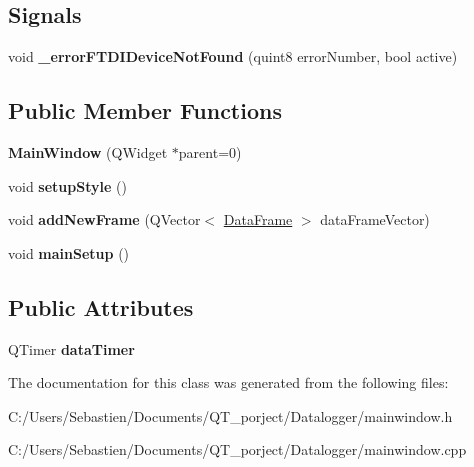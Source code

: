 \subsection*{Signals}
\begin{DoxyCompactItemize}
\item 
\mbox{\label{class_main_window_a7fb16a56a5bdc289ebee60e0d3958a9d}} 
void {\bfseries \+\_\+error\+F\+T\+D\+I\+Device\+Not\+Found} (quint8 error\+Number, bool active)
\end{DoxyCompactItemize}
\subsection*{Public Member Functions}
\begin{DoxyCompactItemize}
\item 
\mbox{\label{class_main_window_a8b244be8b7b7db1b08de2a2acb9409db}} 
{\bfseries Main\+Window} (Q\+Widget $\ast$parent=0)
\item 
\mbox{\label{class_main_window_a143e270946cc75c8b6ab9f44e260b515}} 
void {\bfseries setup\+Style} ()
\item 
\mbox{\label{class_main_window_aadbb2583bcb8abf2053763b137950c21}} 
void {\bfseries add\+New\+Frame} (Q\+Vector$<$ \hyperlink{class_data_frame}{Data\+Frame} $>$ data\+Frame\+Vector)
\item 
\mbox{\label{class_main_window_abeb0ce89e46a2a9312ccc2e19247c83b}} 
void {\bfseries main\+Setup} ()
\end{DoxyCompactItemize}
\subsection*{Public Attributes}
\begin{DoxyCompactItemize}
\item 
\mbox{\label{class_main_window_a2c87ed89832cc91aba5eaaae189101d3}} 
Q\+Timer {\bfseries data\+Timer}
\end{DoxyCompactItemize}


The documentation for this class was generated from the following files\+:\begin{DoxyCompactItemize}
\item 
C\+:/\+Users/\+Sebastien/\+Documents/\+Q\+T\+\_\+porject/\+Datalogger/mainwindow.\+h\item 
C\+:/\+Users/\+Sebastien/\+Documents/\+Q\+T\+\_\+porject/\+Datalogger/mainwindow.\+cpp\end{DoxyCompactItemize}
